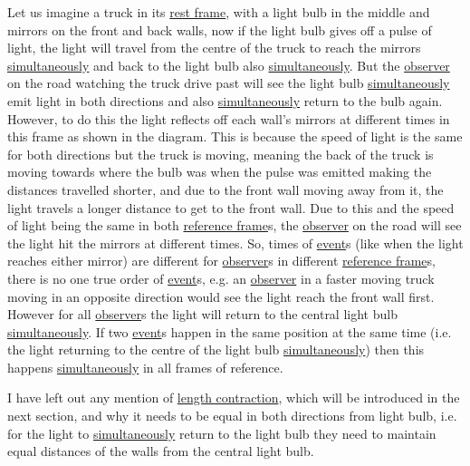 Let us imagine a truck in its \hyperlink{def-proper-frame}{rest frame}, with a light bulb in the middle and mirrors on the front and back walls, now if the light bulb gives off a pulse of light, the light will travel from the centre of the truck to reach the mirrors \hyperlink{def-simultaneity}{simultaneously} and back to the light bulb also \hyperlink{def-simultaneity}{simultaneously}.
But the \hyperlink{def-observer}{observer} on the road watching the truck drive past will see the light bulb \hyperlink{def-simultaneity}{simultaneously} emit light in both directions and also \hyperlink{def-simultaneity}{simultaneously} return to the bulb again. However, to do this the light reflects off each wall's mirrors at different times in this frame as shown in the diagram. This is because the speed of light is the same for both directions but the truck is moving, meaning the back of the truck is moving towards where the bulb was when the pulse was emitted making the distances travelled shorter, and due to the front wall moving away from it, the light travels a longer distance to get to the front wall. Due to this and the speed of light being the same in both \hyperlink{def-Reference-frame}{reference frame}s, the \hyperlink{def-observer}{observer} on the road will see the light hit the mirrors at different times.
So, times of \hyperlink{def-event}{event}s (like when the light reaches either mirror) are different for \hyperlink{def-observer}{observer}s in different \hyperlink{def-Reference-frame}{reference frame}s, there is no one true order of \hyperlink{def-event}{event}s, e.g. an \hyperlink{def-observer}{observer} in a faster moving truck moving in an opposite direction would see the light reach the front wall first.
However for all \hyperlink{def-observer}{observer}s the light will return to the central light bulb \hyperlink{def-simultaneity}{simultaneously}. If two \hyperlink{def-event}{event}s happen in the same position at the same time (i.e. the light returning to the centre of the light bulb \hyperlink{def-simultaneity}{simultaneously}) then this happens \hyperlink{def-simultaneity}{simultaneously} in all frames of reference.

I have left out any mention of \hyperlink{def-length-contraction}{length contraction}, which will be introduced in the next section, and why it needs to be equal in both directions from light bulb, i.e. for the light to \hyperlink{def-simultaneity}{simultaneously} return to the light bulb they need to maintain equal distances of the walls from the central light bulb.


